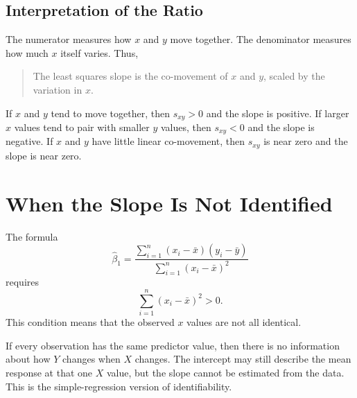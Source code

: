 \subsection{Interpretation of the Ratio}

The numerator measures how $x$ and $y$ move together.  The denominator measures how much $x$ itself varies.  Thus,
\begin{quote}
  The least squares slope is the co-movement of $x$ and $y$, scaled by the variation in $x$.
\end{quote}

If $x$ and $y$ tend to move together, then $s_{xy}>0$ and the slope is positive.  If larger $x$ values tend to pair with smaller $y$ values, then $s_{xy}<0$ and the slope is negative.  If $x$ and $y$ have little linear co-movement, then $s_{xy}$ is near zero and the slope is near zero.

\section{When the Slope Is Not Identified}

The formula
\begin{equation}
  \widehat{\beta}_1=\frac{\sum_{i=1}^n (x_i-\bar{x})(y_i-\bar{y})}{\sum_{i=1}^n (x_i-\bar{x})^2}
\end{equation}
requires
\begin{equation}
  \sum_{i=1}^n (x_i-\bar{x})^2>0.
\end{equation}
This condition means that the observed $x$ values are not all identical.

If every observation has the same predictor value, then there is no information about how $Y$ changes when $X$ changes.  The intercept may still describe the mean response at that one $X$ value, but the slope cannot be estimated from the data.  This is the simple-regression version of identifiability.


